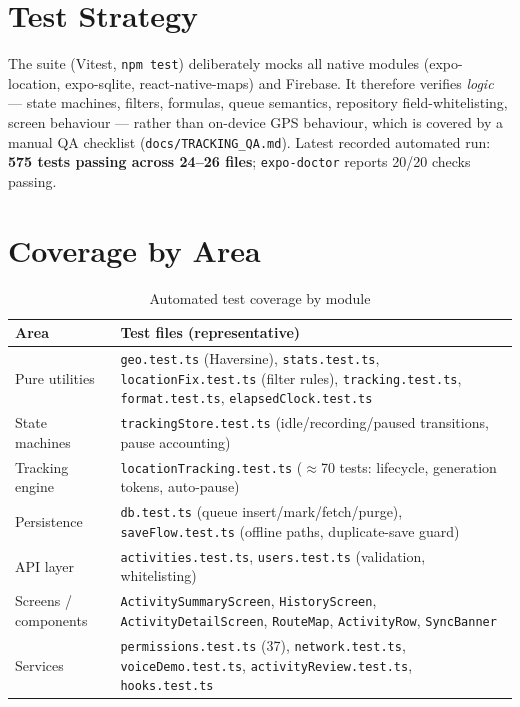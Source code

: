 \documentclass[11pt,a4paper]{report}
\begin{document}
\section{Test Strategy}
The suite (Vitest, \texttt{npm test}) deliberately mocks all native modules (expo-location, expo-sqlite, react-native-maps) and Firebase. It therefore verifies \textit{logic} --- state machines, filters, formulas, queue semantics, repository field-whitelisting, screen behaviour --- rather than on-device GPS behaviour, which is covered by a manual QA checklist (\texttt{docs/TRACKING\_QA.md}). Latest recorded automated run: \textbf{575 tests passing across 24--26 files}; \texttt{expo-doctor} reports 20/20 checks passing.

\section{Coverage by Area}
\begin{table}[htbp]
\centering
\caption{Automated test coverage by module}
\begin{tabular}{p{4.6cm} p{10.4cm}}
\toprule
\textbf{Area} & \textbf{Test files (representative)} \\
\midrule
Pure utilities & \texttt{geo.test.ts} (Haversine), \texttt{stats.test.ts}, \texttt{locationFix.test.ts} (filter rules), \texttt{tracking.test.ts}, \texttt{format.test.ts}, \texttt{elapsedClock.test.ts} \\
State machines & \texttt{trackingStore.test.ts} (idle/recording/paused transitions, pause accounting) \\
Tracking engine & \texttt{locationTracking.test.ts} ($\approx$70 tests: lifecycle, generation tokens, auto-pause) \\
Persistence & \texttt{db.test.ts} (queue insert/mark/fetch/purge), \texttt{saveFlow.test.ts} (offline paths, duplicate-save guard) \\
API layer & \texttt{activities.test.ts}, \texttt{users.test.ts} (validation, whitelisting) \\
Screens / components & \texttt{ActivitySummaryScreen}, \texttt{HistoryScreen}, \texttt{ActivityDetailScreen}, \texttt{RouteMap}, \texttt{ActivityRow}, \texttt{SyncBanner} \\
Services & \texttt{permissions.test.ts} (37), \texttt{network.test.ts}, \texttt{voiceDemo.test.ts}, \texttt{activityReview.test.ts}, \texttt{hooks.test.ts} \\
\bottomrule
\end{tabular}
\end{table}
\end{document}
